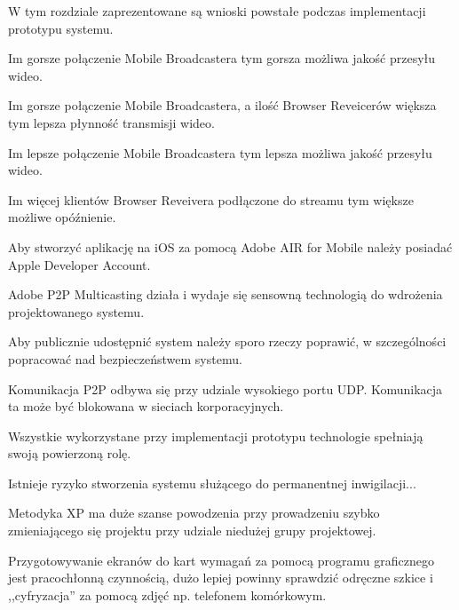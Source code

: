 W tym rozdziale zaprezentowane są wnioski powstałe podczas implementacji prototypu systemu.

\begin{packed_item}
    \item{Im gorsze połączenie Mobile Broadcastera tym gorsza możliwa jakość przesyłu wideo.}
    \item{Im gorsze połączenie Mobile Broadcastera, a ilość Browser Reveicerów większa tym lepsza płynność transmisji wideo.}
    \item{Im lepsze połączenie Mobile Broadcastera tym lepsza możliwa jakość przesyłu wideo.}
    \item{Im więcej klientów Browser Reveivera podłączone do streamu tym większe możliwe opóźnienie.}
    \item{Aby stworzyć aplikację na iOS za pomocą Adobe AIR for Mobile należy posiadać Apple Developer Account.}
    \item{Adobe P2P Multicasting działa i wydaje się sensowną technologią do wdrożenia projektowanego systemu.}
    \item{Aby publicznie udostępnić system należy sporo rzeczy poprawić, w szczególności popracować nad bezpieczeństwem systemu.}
    \item{Komunikacja P2P odbywa się przy udziale wysokiego portu UDP. Komunikacja ta może być blokowana w sieciach korporacyjnych.}
    \item{Wszystkie wykorzystane przy implementacji prototypu technologie spełniają swoją powierzoną rolę.}
    \item{Istnieje ryzyko stworzenia systemu służącego do permanentnej inwigilacji...}
    \item{Metodyka XP ma duże szanse powodzenia przy prowadzeniu szybko zmieniającego się projektu przy udziale niedużej grupy projektowej.}
    \item{Przygotowywanie ekranów do kart wymagań za pomocą programu graficznego jest pracochłonną czynnością, dużo lepiej powinny sprawdzić odręczne szkice i ,,cyfryzacja'' za pomocą zdjęć np. telefonem komórkowym.}
\end{packed_item}
